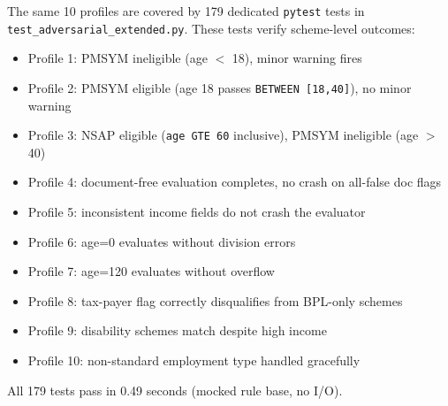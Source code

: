 \documentclass[11pt,a4paper]{article}
\newcommand{\ic}[1]{\texttt{\color{accent}#1}}
\begin{document}
The same 10 profiles are covered by 179 dedicated \texttt{pytest} tests in \ic{test\_adversarial\_extended.py}. These tests verify scheme-level outcomes:

\begin{itemize}[nosep, leftmargin=1.5em]
  \item Profile 1: PMSYM ineligible (age $<$ 18), minor warning fires
  \item Profile 2: PMSYM eligible (age 18 passes \ic{BETWEEN [18,40]}), no minor warning
  \item Profile 3: NSAP eligible (\ic{age GTE 60} inclusive), PMSYM ineligible (age $>$ 40)
  \item Profile 4: document-free evaluation completes, no crash on all-false doc flags
  \item Profile 5: inconsistent income fields do not crash the evaluator
  \item Profile 6: age=0 evaluates without division errors
  \item Profile 7: age=120 evaluates without overflow
  \item Profile 8: tax-payer flag correctly disqualifies from BPL-only schemes
  \item Profile 9: disability schemes match despite high income
  \item Profile 10: non-standard employment type handled gracefully
\end{itemize}

All 179 tests pass in 0.49 seconds (mocked rule base, no I/O).
\end{document}
